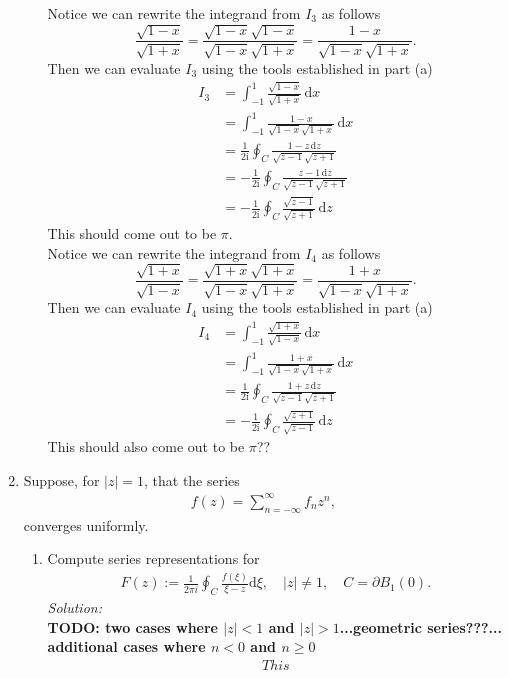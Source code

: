 \documentclass[10pt]{amsart}
\newcommand{\D}{\mathrm{d}}
\newcommand{\I}{\mathrm{i}}
\theoremstyle{nonumberplain}
\begin{document}
\begin{enumerate}[label={\bf {\arabic*}:}]
\begin{enumerate}
\noindent
Notice we can rewrite the integrand from $I_3$ as follows
$$
\frac{\sqrt{1 -x}}{ \sqrt{1 + x}} = \frac{\sqrt{1 -x}\sqrt{1 -x}}{\sqrt{1 -x}\sqrt{1 + x}} = \frac{1 - x}{\sqrt{1 - x}\sqrt{1 + x}}.
$$
Then we can evaluate $I_3$ using the tools established in part (a)
\begin{align*}
I_3 &= \int_{-1}^1 \frac{\sqrt{1 -x}}{ \sqrt{1 + x}}\, \D x \\
	&= \int_{-1}^1 \frac{1 - x}{\sqrt{1 - x}\sqrt{1 + x}}\, \D x \\
	&= \frac{1}{2\I} \oint_C \frac{1 - z\, \D z}{\sqrt{z -1} \sqrt{z + 1}} \\
	&= - \frac{1}{2\I} \oint_C \frac{z - 1\, \D z}{\sqrt{z -1} \sqrt{z + 1}} \\
	&= - \frac{1}{2\I} \oint_C \frac{\sqrt{z - 1}}{\sqrt{z + 1}}\, \D z
\end{align*}
This should come out to be $\pi$. \\

\noindent
Notice we can rewrite the integrand from $I_4$ as follows
$$
\frac{\sqrt{1 + x}}{ \sqrt{1- x}} = \frac{\sqrt{1+ x}\sqrt{1+ x}}{\sqrt{1- x}\sqrt{1 + x}} = \frac{1 + x}{\sqrt{1 - x}\sqrt{1 + x}}.
$$
Then we can evaluate $I_4$ using the tools established in part (a)
\begin{align*}
I_4 &= \int_{-1}^1 \frac{\sqrt{1 + x}}{ \sqrt{1- x}}\, \D x \\
	&= \int_{-1}^1 \frac{1 + x}{\sqrt{1 - x}\sqrt{1 + x}}\, \D x \\
	&= \frac{1}{2\I} \oint_C \frac{1 + z\, \D z}{\sqrt{z -1} \sqrt{z + 1}} \\
	&= - \frac{1}{2\I} \oint_C \frac{\sqrt{z + 1}}{\sqrt{z - 1}}\, \D z
\end{align*}
This should also come out to be $\pi$?? \\
\end{enumerate}
\newpage

\item Suppose, for $|z| = 1$, that the series
\begin{align*}
f(z) = \sum_{n = -\infty}^\infty f_n z^n,
\end{align*}
converges uniformly.
\begin{enumerate}
\item Compute series representations for
\begin{align*}
F(z) := \frac{1}{2 \pi i} \oint_{C} \frac{f(\xi)}{\xi - z} \D \xi,
\quad |z| \neq 1, \quad C = \partial B_1(0).
\end{align*}
\textit{Solution:} \\
\textbf{TODO: two cases where $|z| < 1$ and $|z| > 1$...geometric series???... additional cases where $n < 0$ and $n \geq 0$}
\begin{align*}
This
\end{align*}


\end{enumerate}
\end{enumerate}
\end{document}
